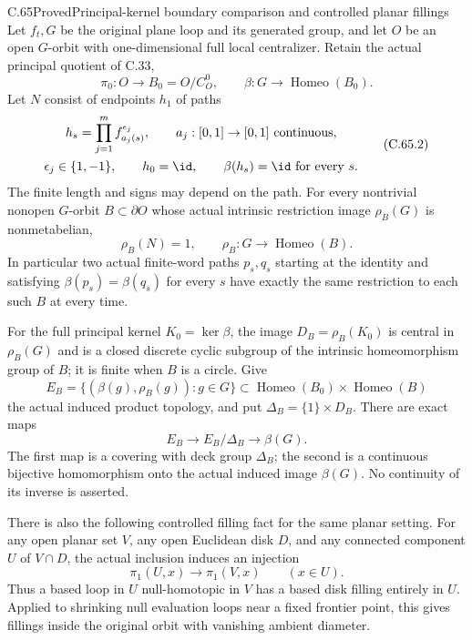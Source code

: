 \begin{claim}{C.65}{Proved}{Principal-kernel boundary comparison and controlled planar fillings}
Let $f_t,G$ be the original plane loop and its generated
group, and let $O$ be an open $G$-orbit with one-dimensional
full local centralizer. Retain the actual principal quotient
of C.33,
\[
 \pi_0:O\longrightarrow B_0=O/C_O^0,
 \qquad
 \beta:G\longrightarrow\operatorname{Homeo}(B_0).
                                                               \tag{C.65.1}
\]
Let $N$ consist of endpoints $h_1$ of paths
\[
\begin{gathered}
 h_s=\prod_{j=1}^{m}f_{a_j(s)}^{\epsilon_j},
 \qquad a_j:[0,1]\to[0,1]\ \text{continuous},\\
 \epsilon_j\in\{1,-1\},
 \qquad h_0=\id,\qquad\beta(h_s)=\id\ \text{for every }s.
\end{gathered}
                                                               \tag{C.65.2}
\]
The finite length and signs may depend on the path.
For every nontrivial nonopen $G$-orbit $B\subset\partial O$
whose actual intrinsic restriction image $\rho_B(G)$
is nonmetabelian,
\[
              \rho_B(N)=1,\qquad
 \rho_B:G\longrightarrow\operatorname{Homeo}(B).
                                                               \tag{C.65.3}
\]
In particular two actual finite-word paths $p_s,q_s$
starting at the identity and satisfying
$\beta(p_s)=\beta(q_s)$ for every $s$ have exactly the
same restriction to each such $B$ at every time.

For the full principal kernel $K_0=\ker\beta$, the
image $D_B=\rho_B(K_0)$ is central in $\rho_B(G)$
and is a closed discrete cyclic subgroup of the
intrinsic homeomorphism group of $B$; it is finite
when $B$ is a circle. Give
\[
 E_B=\{(\beta(g),\rho_B(g)):g\in G\}
       \subset\operatorname{Homeo}(B_0)
                    \times\operatorname{Homeo}(B)
\]
the actual induced product topology, and put
$\Delta_B=\{1\}\times D_B$. There are exact maps
\[
 E_B\longrightarrow E_B/\Delta_B
             \longrightarrow\beta(G).
\]
The first map is a covering with deck group
$\Delta_B$; the second is a continuous bijective
homomorphism onto the actual induced image
$\beta(G)$. No continuity of its inverse is asserted.

There is also the following controlled filling fact for
the same planar setting. For any open planar set $V$,
any open Euclidean disk $D$, and any connected component
$U$ of $V\cap D$, the actual inclusion induces an
injection
\[
                        \pi_1(U,x)\longrightarrow\pi_1(V,x)
                    \qquad(x\in U).                    \tag{C.65.4}
\]
Thus a based loop in $U$ null-homotopic in $V$ has a
based disk filling entirely in $U$. Applied to shrinking
null evaluation loops near a fixed frontier point,
this gives fillings inside the original orbit with
vanishing ambient diameter.
\end{claim}

